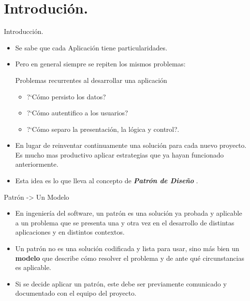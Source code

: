 \section{Introduci\'on.}

\begin{frame}{Introducci\'on.}
	\begin{itemize}
		\item Se sabe que cada Aplicaci\'on tiene particularidades.
		\item Pero en general  siempre se repiten los mismos problemas:
			\begin{block}{Problemas recurrentes al desarrollar una aplicaci\'on}
			\begin{itemize}
				\item ?`C\'omo persisto los datos?
				\item ?`C\'omo autentifico a los usuarios?
				\item ?`C\'omo separo la presentaci\'on, la l\'ogica y control?.
			\end{itemize}
		\end{block}
					\item En lugar de reinventar continuamente una soluci\'on para cada nuevo proyecto. Es mucho mas
					productivo aplicar estrategias que ya hayan funcionado anteriormente.
					\item Esta idea es lo que lleva al concepto de \textit{ \textbf{Patr\'on de Diseño} }.
	\end{itemize}
\end{frame}

\begin{frame}{Patr\'on -> Un Modelo}
	\begin{itemize}
		\item En ingenier\'ia del software, un	patr\'on es una soluci\'on ya probada y aplicable a un
		problema que se presenta una y otra vez en el desarrollo de distintas aplicaciones y en
		distintos contextos.
		\item Un patr\'on no es una soluci\'on  codificada y lista para usar, sino más bien un \textbf{modelo}
		que describe c\'omo resolver el problema y de ante qu\'e circunstancias es aplicable.
		\item Si se decide aplicar un patr\'on, este debe ser previamente comunicado y documentado con el equipo del proyecto.
	\end{itemize}
\end{frame}

